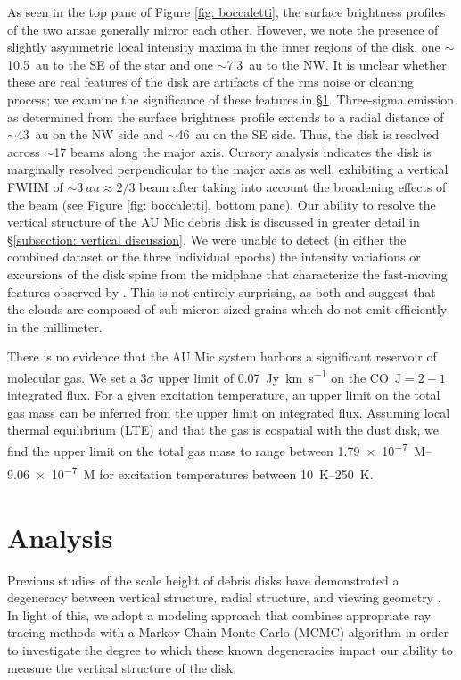 \documentclass[modern]{aastex62}
\begin{document}
As seen in the top pane of Figure \ref{fig: boccaletti}, the surface brightness profiles of the two ansae generally mirror each other.
However, we note the presence of slightly asymmetric local intensity maxima in the inner regions of the disk, one $\sim$\SI{10.5}{au} to the SE of the star and one $\sim$\SI{7.3}{au} to the NW. 
It is unclear whether these are real features of the disk are artifacts of the rms noise or cleaning process; we examine the significance of these features in \S \ref{section: analysis}.
Three-sigma emission as determined from the surface brightness profile extends to a radial distance of $\sim$\SI{43}{au} on the NW side and $\sim$\SI{46}{au} on the SE side. 
Thus, the disk is resolved across $\sim$17 beams along the major axis. 
Cursory analysis indicates the disk is marginally resolved perpendicular to the major axis as well, exhibiting a vertical FWHM  of $\sim$$\SI{3}{au} \approx 2/3$ beam after taking into account the broadening effects of the beam (see Figure \ref{fig: boccaletti}, bottom pane).
Our ability to resolve the vertical structure of the AU Mic debris disk is discussed in greater detail in \S \ref{subsection: vertical discussion}.
We were unable to detect (in either the combined dataset or the three individual epochs) the intensity variations or excursions of the disk spine from the midplane that characterize the fast-moving features observed by \cite{boccaletti15,boccaletti18}.
This is not entirely surprising, as both \cite{sezestre17} and \cite{chiang&fung17} suggest that the clouds are composed of sub-micron-sized grains which do not emit efficiently in the millimeter.


There is no evidence that the AU Mic system harbors a significant reservoir of molecular gas.
We set a $3 \sigma$ upper limit of \SI{0.07}{Jy.km.s^{-1}} on the CO~$\mathrm{J}=2-1$ integrated flux.
For a given excitation temperature, an upper limit on the total gas mass can be inferred from the upper limit on integrated flux.
Assuming local thermal equilibrium (LTE) and that the gas is cospatial with the dust disk, we find the upper limit on the total gas mass to range between \SIrange[range-phrase=\ and\ ]{1.79e-7}{9.06e-7}{M_\earth} for excitation temperatures between \SIrange[range-phrase=\ and\ ]{10}{250}{K}.


\section{Analysis}
\label{section: analysis}
Previous studies of the scale height of debris disks have demonstrated a degeneracy between vertical structure, radial structure, and viewing geometry \citep[e.g.,][]{milli14}.  
In light of this, we adopt a modeling approach that combines appropriate ray tracing methods with a Markov Chain Monte Carlo (MCMC) algorithm in order to investigate the degree to which these known degeneracies impact our ability to measure the vertical structure of the disk.  
\end{document}
